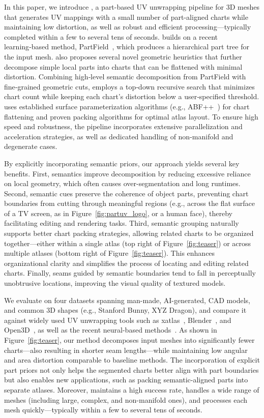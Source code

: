 In this paper, we introduce \ourmodel, a part-based UV unwrapping pipeline for 3D meshes that generates UV mappings with a small number of part-aligned charts while maintaining low distortion, as well as robust and efficient processing—typically completed within a few to several tens of seconds. \ourmodel builds on a recent learning‑based method, PartField~\cite{liu2025partfield}, which produces a hierarchical part tree for the input mesh. \ourmodel also proposes several novel geometric heuristics that further decompose simple local parts into charts that can be flattened with minimal distortion. Combining high‑level semantic decomposition from PartField with fine‑grained geometric cuts, \ourmodel employs a top‑down recursive search that minimizes chart count while keeping each chart’s distortion below a user‑specified threshold. \ourmodel uses established surface parameterization algorithms (e.g., ABF++~\cite{sheffer2005abf++}) for chart flattening and proven packing algorithms for optimal atlas layout. To ensure high speed and robustness, the pipeline incorporates extensive parallelization and acceleration strategies, as well as dedicated handling of non-manifold and degenerate cases.

By explicitly incorporating semantic priors, our approach yields several key benefits. First, semantics improve decomposition by reducing excessive reliance on local geometry, which often causes over-segmentation and long runtimes. Second, semantic cues preserve the coherence of object parts, preventing chart boundaries from cutting through meaningful regions (e.g., across the flat surface of a TV screen, as in Figure~\ref{fig:partuv_logo}, or a human face), thereby facilitating editing and rendering tasks. Third, semantic grouping naturally supports better chart packing strategies, allowing related charts to be organized together—either within a single atlas (top right of Figure~\ref{fig:teaser}) or across multiple atlases (bottom right of Figure~\ref{fig:teaser}). This enhances organizational clarity and simplifies the process of locating and editing related charts. Finally, seams guided by semantic boundaries tend to fall in perceptually unobtrusive locations, improving the visual quality of textured models.

We evaluate \ourmodel on four datasets spanning man-made, AI-generated, CAD models, and common 3D shapes (e.g., Stanford Bunny, XYZ Dragon), and compare it against widely used UV unwrapping tools such as xatlas~\cite{xatlas}, Blender~\cite{blender}, and Open3D~\cite{zhou2018open3d}, as well as the recent neural-based methods~\cite{srinivasan2024nuvo}. As shown in Figure~\ref{fig:teaser}, our method decomposes input meshes into significantly fewer charts—also resulting in shorter seam lengths—while maintaining low angular and area distortion comparable to baseline methods. The incorporation of explicit part priors not only helps the segmented charts better align with part boundaries but also enables new applications, such as packing semantic-aligned parts into separate atlases. Moreover, \ourmodel maintains a high success rate, handles a wide range of meshes (including large, complex, and non-manifold ones), and processes each mesh quickly—typically within a few to several tens of seconds. 


